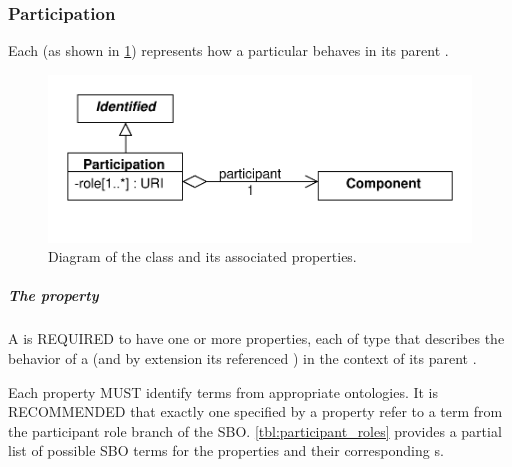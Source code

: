\subsubsection{Participation}
\label{sec:Participation}

Each  (as shown in \ref{uml:participation}) represents how a particular  behaves in its parent .

\begin{figure}[ht]
\begin{center}
\includegraphics[scale=0.6]{uml/participation}
\caption[]{Diagram of the  class and its associated properties.}
\label{uml:participation}
\end{center}
\end{figure}

\subparagraph{The  property}\label{sec:role:P}

A  is REQUIRED to have one or more  properties, each of type  that describes the behavior of a  (and by extension its referenced ) in the context of its parent .

Each  property MUST identify terms from appropriate ontologies. It is RECOMMENDED that exactly one  specified by a  property refer to a term from the participant role branch of the SBO. \ref{tbl:participant_roles} provides a partial list of possible SBO terms for the  properties and their corresponding s.

